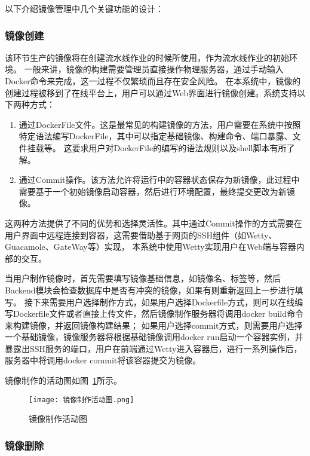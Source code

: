 以下介绍镜像管理中几个关键功能的设计：

\subsubsection{镜像创建}

该环节生产的镜像将在创建流水线作业的时候所使用，作为流水线作业的初始环境。
一般来讲，镜像的构建需要管理员直接操作物理服务器，通过手动输入Docker命令来完成，这一过程不仅繁琐而且存在安全风险。
在本系统中，镜像的创建过程被移到了在线平台上，用户可以通过Web界面进行镜像创建。系统支持以下两种方式：
\begin{enumerate}
  \item 通过DockerFile文件。这是最常见的构建镜像的方法，用户需要在系统中按照特定语法编写DockerFile，其中可以指定基础镜像、构建命令、端口暴露、文件挂载等。
  这要求用户对DockerFile的编写的语法规则以及shell脚本有所了解。
  \item 通过Commit操作。该方法允许将运行中的容器状态保存为新镜像，此过程中需要基于一个初始镜像启动容器，然后进行环境配置，最终提交更改为新镜像。
\end{enumerate}

这两种方法提供了不同的优势和选择灵活性。其中通过Commit操作的方式需要在用户界面中远程连接到容器，这需要借助基于网页的SSH组件（如Wetty、Guacamole、GateWay等）实现，
本系统中使用Wetty实现用户在Web端与容器内部的交互。

当用户制作镜像时，首先需要填写镜像基础信息，如镜像名、标签等，然后Backend模块会检查数据库中是否有冲突的镜像，如果有则重新返回上一步进行填写。
接下来需要用户选择制作方式，如果用户选择Dockerfile方式，则可以在线编写Dockerfile文件或者直接上传文件，然后镜像制作服务器将调用docker build命令来构建镜像，并返回镜像构建结果；
如果用户选择commit方式，则需要用户选择一个基础镜像，镜像服务器将根据基础镜像调用docker run启动一个容器实例，并暴露出SSH服务的端口，用户在前端通过Wetty进入容器后，进行一系列操作后，
服务器中将调用docker commit将该容器提交为镜像。

镜像制作的活动图如图~\ref{fig:镜像制作活动图}所示。

\begin{figure}[h]
  \centering
  \texttt{[image: 镜像制作活动图.png]}
  \caption{镜像制作活动图}
  \label{fig:镜像制作活动图}
\end{figure}

\subsubsection{镜像删除}

